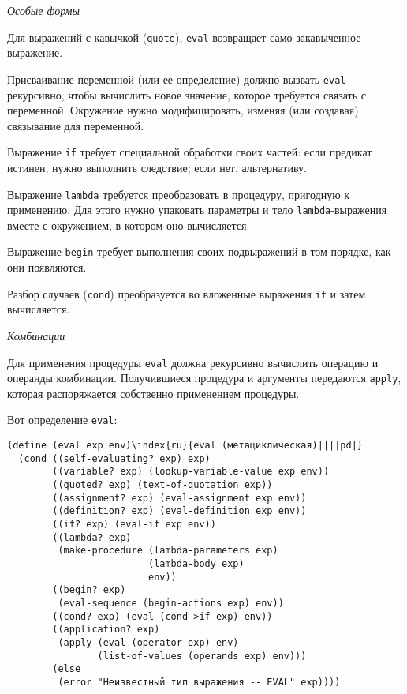 {\em Особые формы}
\begin{plainlist}
\item
Для выражений с кавычкой ({\tt quote}),
{\tt eval} возвращает само закавыченное выражение.

\item
Присваивание переменной (или ее определение) должно
вызвать {\tt eval} рекурсивно, чтобы вычислить новое значение,
которое требуется связать с переменной.  Окружение нужно
модифицировать, изменяя (или создавая) связывание для
переменной.

\item
Выражение {\tt if} требует специальной
обработки своих частей: если предикат истинен, нужно выполнить
следствие; если нет, альтернативу.

\item
Выражение {\tt lambda} требуется
преобразовать в процедуру, пригодную к применению.  Для этого нужно
упаковать параметры и тело {\tt lambda}-выраже\-ния вместе
с окружением, в котором оно вычисляется.

\item
Выражение {\tt begin} требует выполнения
своих подвыражений в том порядке, как они появляются.

\item
Разбор случаев ({\tt cond}) преобразуется во вложенные
выражения {\tt if} и затем вычисляется.
\end{plainlist}

\medskip

{\em Комбинации}
\begin{plainlist}
\item
Для применения процедуры {\tt eval} должна
рекурсивно вычислить операцию и операнды комбинации.  Получившиеся
процедура и аргументы передаются {\tt apply}, которая распоряжается
собственно применением процедуры.
\end{plainlist}

Вот определение {\tt eval}:

\begin{Verbatim}[fontsize=\small]
(define (eval exp env)\index{ru}{eval (метациклическая)||||pd|}
  (cond ((self-evaluating? exp) exp)
        ((variable? exp) (lookup-variable-value exp env))
        ((quoted? exp) (text-of-quotation exp))
        ((assignment? exp) (eval-assignment exp env))
        ((definition? exp) (eval-definition exp env))
        ((if? exp) (eval-if exp env))
        ((lambda? exp)
         (make-procedure (lambda-parameters exp)
                         (lambda-body exp)
                         env))
        ((begin? exp) 
         (eval-sequence (begin-actions exp) env))
        ((cond? exp) (eval (cond->if exp) env))
        ((application? exp)
         (apply (eval (operator exp) env)
                (list-of-values (operands exp) env)))
        (else
         (error "Неизвестный тип выражения -- EVAL" exp))))
\end{Verbatim}

